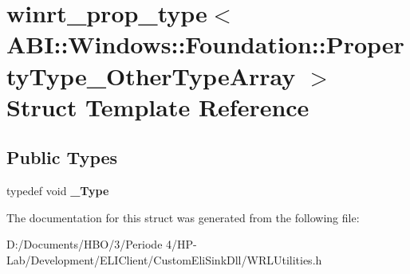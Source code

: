 \hypertarget{structwinrt__prop__type_3_01_a_b_i_1_1_windows_1_1_foundation_1_1_property_type___other_type_array_01_4}{}\section{winrt\+\_\+prop\+\_\+type$<$ A\+BI\+:\+:Windows\+:\+:Foundation\+:\+:Property\+Type\+\_\+\+Other\+Type\+Array $>$ Struct Template Reference}
\label{structwinrt__prop__type_3_01_a_b_i_1_1_windows_1_1_foundation_1_1_property_type___other_type_array_01_4}
\subsection*{Public Types}
\begin{DoxyCompactItemize}
\item 
\mbox{\label{structwinrt__prop__type_3_01_a_b_i_1_1_windows_1_1_foundation_1_1_property_type___other_type_array_01_4_a5aa2dfc170d47e14440a8fb4e08f7acd}} 
typedef void {\bfseries \+\_\+\+Type}
\end{DoxyCompactItemize}


The documentation for this struct was generated from the following file\+:\begin{DoxyCompactItemize}
\item 
D\+:/\+Documents/\+H\+B\+O/3/\+Periode 4/\+H\+P-\/\+Lab/\+Development/\+E\+L\+I\+Client/\+Custom\+Eli\+Sink\+Dll/W\+R\+L\+Utilities.\+h\end{DoxyCompactItemize}

